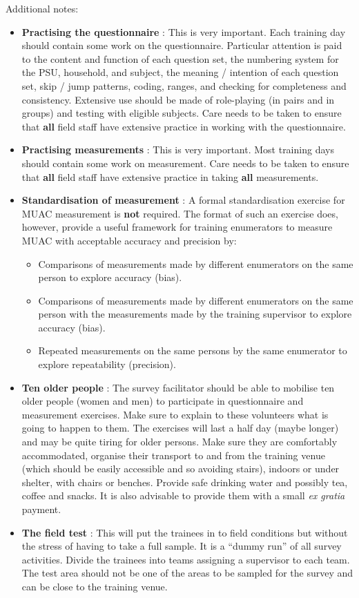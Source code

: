 \documentclass[12pt,a4paper]{book}
\begin{document}
Additional notes:

\begin{itemize}
\item
  \textbf{Practising the questionnaire} : This is very important. Each training day should contain some work on the questionnaire. Particular attention is paid to the content and function of each question set, the numbering system for the PSU, household, and subject, the meaning / intention of each question set, skip / jump patterns, coding, ranges, and checking for completeness and consistency. Extensive use should be made of role-playing (in pairs and in groups) and testing with eligible subjects. Care needs to be taken to ensure that \textbf{all} field staff have extensive practice in working with the questionnaire.
\item
  \textbf{Practising measurements} : This is very important. Most training days should contain some work on measurement. Care needs to be taken to ensure that \textbf{all} field staff have extensive practice in taking \textbf{all} measurements.
\item
  \textbf{Standardisation of measurement} : A formal standardisation exercise for MUAC measurement is \textbf{not} required. The format of such an exercise does, however, provide a useful framework for training enumerators to measure MUAC with acceptable accuracy and precision by:

  \begin{itemize}
  \item
    Comparisons of measurements made by different enumerators on the same person to explore accuracy (bias).
  \item
    Comparisons of measurements made by different enumerators on the same person with the measurements made by the training supervisor to explore accuracy (bias).
  \item
    Repeated measurements on the same persons by the same enumerator to explore repeatability (precision).
  \end{itemize}
\item
  \textbf{Ten older people} : The survey facilitator should be able to mobilise ten older people (women and men) to participate in questionnaire and measurement exercises. Make sure to explain to these volunteers what is going to happen to them. The exercises will last a half day (maybe longer) and may be quite tiring for older persons. Make sure they are comfortably accommodated, organise their transport to and from the training venue (which should be easily accessible and so avoiding stairs), indoors or under shelter, with chairs or benches. Provide safe drinking water and possibly tea, coffee and snacks. It is also advisable to provide them with a small \emph{ex gratia} payment.
\item
  \textbf{The field test} : This will put the trainees in to field conditions but without the stress of having to take a full sample. It is a ``dummy run'' of all survey activities. Divide the trainees into teams assigning a supervisor to each team. The test area should not be one of the areas to be sampled for the survey and can be close to the training venue.
\end{itemize}
\end{document}

